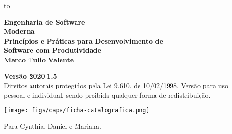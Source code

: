 \thispagestyle{empty}

\begin{titlepage}

\vspace*{-38mm}
  \noindent\vbox to 
\end{titlepage}

\newpage
\thispagestyle{empty}
\vspace*{4cm}
\begin{center}
{\Huge \bf  Engenharia de Software\\[.3cm] Moderna}\\ 
\vspace*{1cm}
{\Large \bf  Princípios e Práticas para Desenvolvimento de\\[.3cm] Software com Produtividade}\\ 
\vspace*{3cm}
{\Large \bf Marco Tulio Valente}
\end{center}
\newpage

\newpage
\thispagestyle{empty}
\vspace*{3cm}
\begin{center}
{\Large \bf  Versão 2020.1.5}\\ 
\vspace*{1cm}
{\large Direitos autorais protegidos pela Lei 9.610, de 10/02/1998. Versão para  uso pessoal e individual, sendo proibida qualquer forma de redistribuição.}
\end{center}

\vspace*{3cm}
\begin{center}
\texttt{[image: figs/capa/ficha-catalografica.png]}
\end{center}

\newpage

\newpage
\thispagestyle{empty}
\vspace*{5cm}
\begin{center}
\large Para Cynthia, Daniel e Mariana.
\end{center}

\newpage
\newpage

\tableofcontents
